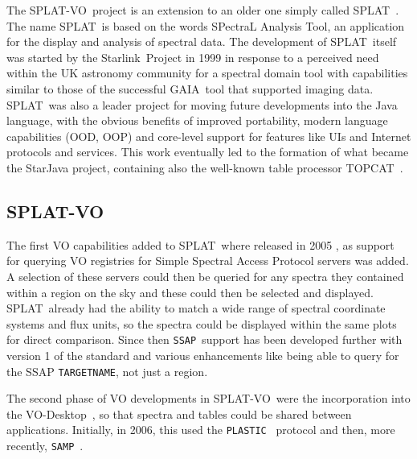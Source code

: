\documentclass[final,authoryear,5p,times,twocolumn]{elsarticle}
\newcommand{\ssap}{\texttt{SSAP}}
\newcommand{\plastic}{\texttt{PLASTIC}}
\newcommand{\samp}{\texttt{SAMP}}
\newcommand{\splat}{\textsf{\small SPLAT}}
\newcommand{\splatvo}{{\textsf{\small{SPLAT-VO}}}}
\newcommand{\topcat}{\textsf{\small TOPCAT}}
\newcommand{\gaia}{\textsf{\small GAIA}}
\newcommand{\Starlink}{\textsf{\small Starlink}}
\newcommand{\vodesktop}{\textsf{\small VO-Desktop}}
\newcommand{\ascl}[1]{\href{http://www.ascl.net/#1}{ascl:#1}}
\begin{document}
The \splatvo\ project is an extension to an older one simply called
\splat\ \citep[][\ascl{1402.007}]{2002ASPC..281..513B}.  The name \splat\
is based on the words SPectraL Analysis Tool, an application for the
display and analysis of spectral data. The development of \splat\ itself
was started by the \Starlink\ Project \citep{1982QJRAS..23..485D} in
1999 in response to a perceived need within the UK astronomy community
for a spectral domain tool with capabilities similar to those of the
successful \gaia\ tool \citep[][\ascl{1403.024}]{2000ASPC..216..615D}
that supported imaging data. \splat\ was also a leader project for
moving future developments into the Java language, with the obvious
benefits of improved portability, modern language capabilities (OOD,
OOP) and core-level support for features like UIs and Internet
protocols and services. This work eventually led to the formation of
what became the StarJava project, containing also the well-known table processor \topcat\ \citep[][\ascl{1101.010}]{2005ASPC..347...29T}.

\subsection{SPLAT-VO}

The first VO capabilities added to \splat\ where released in 2005
\citep{2005ASPC..347...22D}, as support for querying VO registries for Simple
Spectral Access Protocol servers was added. A selection of these servers could
then be queried for any spectra they contained within a region on the sky and
these could then be selected and displayed. \splat\ already had the ability to
match a wide range of spectral coordinate systems and flux units, so the
spectra could be displayed within the same plots for direct comparison. Since
then \ssap\ support has been developed further with version 1 of the standard
and various enhancements like being able to query for the SSAP
\texttt{TARGETNAME}, not just a region.

The second phase of VO developments in \splatvo\ were the incorporation into
the \vodesktop\ \citep{2008ASPC..394..251W}, so that spectra and tables could
be shared between applications.  Initially, in 2006, this used the \plastic\
\citep{2007ASPC..376..511T} protocol and then, more recently, \samp\
\citep{2012ASPC..461..279T}.
\end{document}
